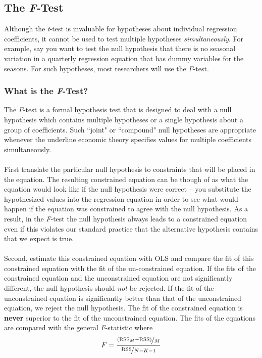\documentclass[11pt]{article}
\begin{document}
\subsection{The \textit{F}-Test}
Although the \textit{t}-test is invaluable for hypotheses about individual regression coefficients, it cannot be used to test multiple hypotheses \textit{simultaneously}. For example, say you want to test the null hypothesis that there is no seasonal variation in a quarterly regression equation that has dummy variables for the seasons. For such hypotheses, most researchers will use the \textit{F}-test.
\subsubsection{What is the \textit{F}-Test?}
The \textit{F}-test is a formal hypothesis test that is designed to deal with a null hypothesis which contains multiple hypotheses or a single hypothesis about a group of coefficients. Such ``joint" or ``compound" null hypotheses are appropriate whenever the underline economic theory specifies values for multiple coefficients simultaneously. \\ \\
First translate the particular null hypothesis to constraints that will be placed in the equation. The resulting constrained equation can be though of as what the equation would look like if the null hypothesis were correct -- you substitute the hypothesized values into the regression equation in order to see what would happen if the equation was constrained to agree with the null hypothesis. As a result, in the \textit{F}-test the null hypothesis always leads to a constrained equation even if this violates our standard practice that the alternative hypothesis contains that we expect is true.\\ \\
Second, estimate this constrained equation with OLS and compare the fit of this constrained equation with the fit of the un-constrained equation. If the fits of the constrained equation and the unconstrained equation are not significantly different, the null hypothesis should \textit{not} be rejected. If the fit of the unconstrained equation is significantly better than that of the unconstrained equation, we reject the null hypothesis. The fit of the constrained equation is \textbf{never} superior to the fit of the unconstrained equation. The fits of the equations are compared with the general \textit{F}-statistic where
\begin{equation}
F = \frac{\nicefrac{(\text{RSS}_M-\text{RSS})}{M}}{\nicefrac{\text{RSS}}{N-K-1}} \label{eg5_11}
\end{equation}
\end{document}
